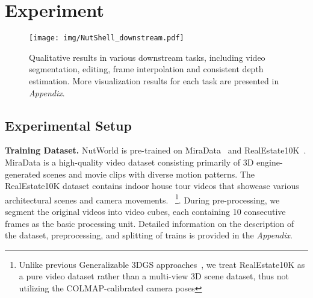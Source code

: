 \section{Experiment}
\label{sec:exp}



\begin{figure*}[t]
\setlength{\abovecaptionskip}{0.2cm}
\setlength{\belowcaptionskip}{0cm}
\centering 
\texttt{[image: img/NutShell\_downstream.pdf]} 
\vspace{-8pt}
\caption{Qualitative results in various downstream tasks, including video segmentation, editing, frame interpolation and consistent depth estimation. More visualization results for each task are presented in \textit{Appendix}.}  
\label{fig:exp2} 
\vspace{-6mm}
\end{figure*}




\subsection{Experimental Setup}

\noindent \textbf{Training Dataset.} 
NutWorld is pre-trained on MiraData~\cite{ju2024miradatalargescalevideodataset} and RealEstate10K~\cite{zhou2018stereo}. MiraData is a high-quality video dataset consisting primarily of 3D engine-generated scenes and movie clips with diverse motion patterns. The RealEstate10K dataset contains indoor house tour videos that showcase various architectural scenes and camera movements.
~\footnote{Unlike previous Generalizable 3DGS approaches~\cite{chen2025mvsplat, pixelsplat, zhang2024transplat}, we treat RealEstate10K as a pure video dataset rather than a multi-view 3D scene dataset, thus not utilizing the COLMAP-calibrated camera poses}. 
During pre-processing, we segment the original videos into video cubes, each containing 10 consecutive frames as the basic processing unit. Detailed information on the description of the dataset, preprocessing, and splitting of trains is provided in the \textit{Appendix}.

